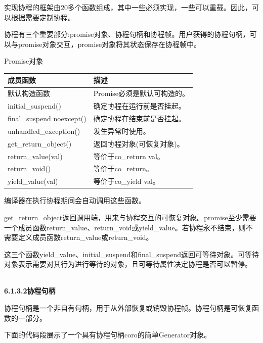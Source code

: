 实现协程的框架由20多个函数组成，其中一些必须实现，一些可以重载。因此，可以根据需要定制协程。

协程有三个重要部分:promise对象、协程句柄和协程帧。用户获得的协程句柄，可以与promise对象交互，promise对象将其状态保存在协程帧中。

\begin{center}
Promise对象
\end{center}

\begin{table}[H]
\centering
\begin{tabular}{ll}
\textbf{成员函数}  & \textbf{描述}                                 \\ \hline
默认构造函数       & Promise必须是默认可构造的。             \\
initial\_suspend()        & 确定协程在运行前是否挂起。 \\
final\_suspend noexcept() & 确定协程在结束前是否挂起。 \\
unhandled\_exception()    & 发生异常时使用。                    \\
get\_return\_object()     & 返回协程对象(可恢复对象)。     \\
return\_value(val)        & 等价于co\_return val。                        \\
return\_void()            & 等价于co\_return。                            \\
yield\_value(val)         & 等价于co\_yield val。                        
\end{tabular}
\end{table}

编译器在执行协程期间会自动调用这些函数。

get\_return\_object返回调用端，用来与协程交互的可恢复对象。promise至少需要一个成员函数return\_value、return\_void或yield\_value。若协程永不结束，则不需要定义成员函数return\_value或return\_void。

这三个函数yield\_value、initial\_suspend和final\_suspend返回可等待对象。可等待对象表示需要对其行为进行等待的对象，且可等待属性决定协程是否可以暂停。

\hspace*{\fill} \\ %
\noindent
\textbf{6.1.3.2\hspace{0.2cm}协程句柄}

协程句柄是一个非自有句柄，用于从外部恢复或销毁协程帧。协程句柄是可恢复函数的一部分。

下面的代码段展示了一个具有协程句柄coro的简单Generator对象。

